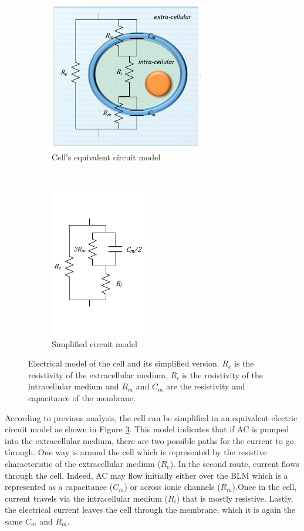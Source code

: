 \begin{figure}[!htbp]
	\centering
	\begin{subfigure}[t]{0.48\textwidth}
		\centering
		\includegraphics[height=6.5cm]{figure2a}
		\caption{Cell's equivalent circuit model}
		\label{fig:cell model}
	\end{subfigure}%
	~ 
	\begin{subfigure}[t]{0.48\textwidth}
		\centering
		\includegraphics[height=6.5cm]{figure2b}
		\caption{Simplified circuit model}
		\label{fig:cell simp model}
	\end{subfigure}
	\caption[Electrical model of the cell]{Electrical model of the cell and its simplified version. $R_e$ is the resistivity of the extracellular medium, $R_i$ is the resistivity of the intracellular medium and $R_m$ and $C_m$ are the resistivity and capacitance of the membrane.}
	\label{fig:cell models}
\end{figure}

According to previous analysis, the cell can be simplified in an equivalent electric circuit model as shown in Figure \ref{fig:cell models}. This model indicates that if AC is pumped into the extracellular medium, there are two possible paths for the current to go through. One way is around the cell which is represented by the resistive characteristic of the extracellular medium ($R_e$). In the second route, current flows through the cell. Indeed, AC may flow initially either over the BLM which is a represented as a capacitance ($C_m$) or across ionic channels ($R_m$).Once in the cell, current travels via the intracellular medium ($R_i$) that is mostly resistive. Lastly, the electrical current leaves the cell through the membrane, which it is again the same $C_m$ and $R_m$.

